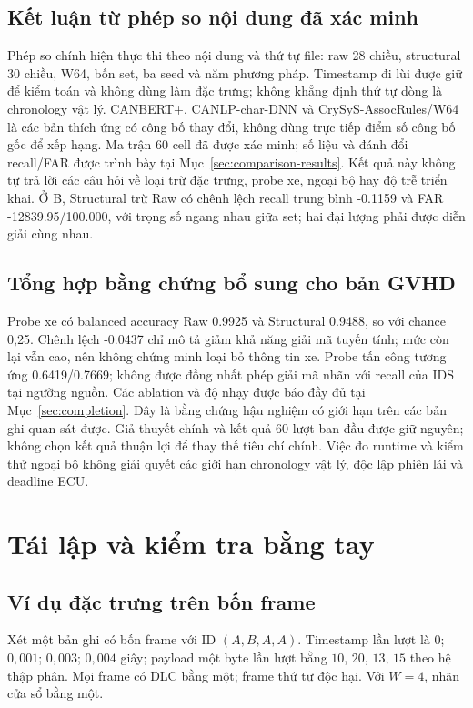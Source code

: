 \documentclass[12pt,a4paper,oneside,openany]{extbook}
\begin{document}
\section{Kết luận từ phép so nội dung đã xác minh}
Phép so chính hiện thực thi theo nội dung và thứ tự file: raw 28 chiều, structural 30 chiều, W64, bốn set, ba seed và năm phương pháp. Timestamp đi lùi được giữ để kiểm toán và không dùng làm đặc trưng; không khẳng định thứ tự dòng là chronology vật lý. CANBERT+, CANLP-char-DNN và CrySyS-AssocRules/W64 là các bản thích ứng có công bố thay đổi, không dùng trực tiếp điểm số công bố gốc để xếp hạng. Ma trận 60 cell đã được xác minh; số liệu và đánh đổi recall/FAR được trình bày tại Mục~\ref{sec:comparison-results}. Kết quả này không tự trả lời các câu hỏi về loại trừ đặc trưng, probe xe, ngoại bộ hay độ trễ triển khai. Ở B, Structural trừ Raw có chênh lệch recall trung bình -0.1159 và FAR -12839.95/100.000, với trọng số ngang nhau giữa set; hai đại lượng phải được diễn giải cùng nhau.

\section{Tổng hợp bằng chứng bổ sung cho bản GVHD}
Probe xe có balanced accuracy Raw 0.9925 và Structural 0.9488, so với chance 0,25. Chênh lệch -0.0437 chỉ mô tả giảm khả năng giải mã tuyến tính; mức còn lại vẫn cao, nên không chứng minh loại bỏ thông tin xe. Probe tấn công tương ứng 0.6419/0.7669; không được đồng nhất phép giải mã nhãn với recall của IDS tại ngưỡng nguồn.
Các ablation và độ nhạy được báo đầy đủ tại Mục~\ref{sec:completion}. Đây là bằng chứng hậu nghiệm có giới hạn trên các bản ghi quan sát được. Giả thuyết chính và kết quả 60 lượt ban đầu được giữ nguyên; không chọn kết quả thuận lợi để thay thế tiêu chí chính. Việc đo runtime và kiểm thử ngoại bộ không giải quyết các giới hạn chronology vật lý, độc lập phiên lái và deadline ECU.


\appendix
\chapter{Tái lập và kiểm tra bằng tay}\label{app:reproducibility}
\section{Ví dụ đặc trưng trên bốn frame}
Xét một bản ghi có bốn frame với ID $(A,B,A,A)$. Timestamp lần lượt là $0$; $0{,}001$; $0{,}003$; $0{,}004$ giây; payload một byte lần lượt bằng $10$, $20$, $13$, $15$ theo hệ thập phân. Mọi frame có DLC bằng một; frame thứ tư độc hại. Với $W=4$, nhãn cửa sổ bằng một.
\end{document}
